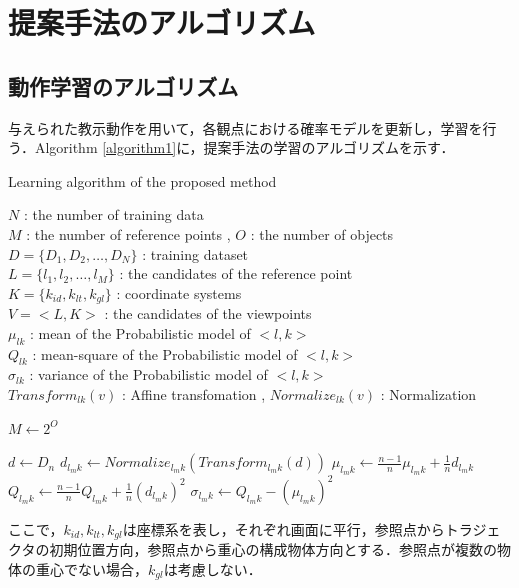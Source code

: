 ﻿\appendix
\chapter{提案手法のアルゴリズム}\label{appendix3}

\section{動作学習のアルゴリズム}

与えられた教示動作を用いて，各観点における確率モデルを更新し，学習を行う．Algorithm \ref{algorithm1}に，提案手法の学習のアルゴリズムを示す．
	\begin{algorithm}[b]
		\caption{ Learning algorithm of the proposed method}
		\label{algorithm1}
		\begin{algorithmic}
			\REQUIRE
				$N$ : the number of training data \\
				$M$ : the number of reference points , 
				$O$ : the number of objects \\
				$D = \{D_{1} , D_{2} , \ldots , D_{N}\}$ : training dataset \\
				$L = \{l_{1} , l_{2} , \ldots , l_{M}\}$ : the candidates of the reference point \\
				$K = \{k_{id} , k_{lt} , k_{gl}\}$ : coordinate systems \\
				$V = <L , K>$ : the candidates of the viewpoints \\
				$μ_{lk}$ : mean of the Probabilistic model of $<l , k>$ \\
				$Q_{lk}$ : mean-square of the Probabilistic model of $<l , k>$ \\
				$σ_{lk}$ : variance of the Probabilistic model of $<l , k>$ \\
				$Transform_{lk}(v)$ : Affine transfomation , 
				$Normalize_{lk}(v)$ : Normalization
		\end{algorithmic}
		\begin{algorithmic}[1]
			\STATE $M \leftarrow 2^{O}$
			
			\FOR{$n=1$ to $N$}
				\STATE $d \leftarrow D_{n}$
				\FOR{$m=1$ to $M$}
					\FOR{all $k ∈K$}
						\STATE $d_{l_{m}k} \leftarrow Normalize_{l_{m}k}(Transform_{l_{m}k}(d))$
						\STATE $μ_{l_{m}k} \leftarrow \frac{n-1}{n}μ_{l_{m}k} + \frac{1}{n}d_{l_{m}k}$
						\STATE $Q_{l_{m}k} \leftarrow \frac{n-1}{n}Q_{l_{m}k} + \frac{1}{n}(d_{l_{m}k})^2$
						\STATE $σ_{l_{m}k} \leftarrow Q_{l_{m}k} - (μ_{l_{m}k})^2$
					\ENDFOR
				\ENDFOR
			\ENDFOR
		\end{algorithmic}
	\end{algorithm}
ここで，$k_{id} , k_{lt} , k_{gl}$は座標系を表し，それぞれ画面に平行，参照点からトラジェクタの初期位置方向，参照点から重心の構成物体方向とする．参照点が複数の物体の重心でない場合，$k_{gl}$は考慮しない．


